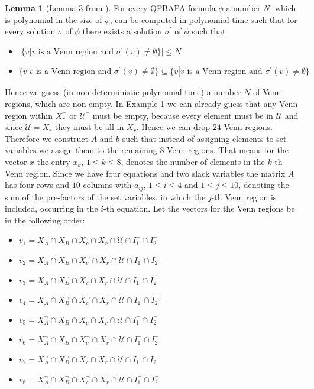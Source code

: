\documentclass{book}
\theoremstyle{break}
\theoremstyle{definition}
\newtheorem{mylem}{Lemma}
\begin{document}
\begin{mylem}[Lemma 3 from \cite{4}]
For every QFBAPA formula $\phi$ a number $N$, which is polynomial in the size of $\phi$, can be computed in polynomial time such that for every solution $\sigma$ of $\phi$ there exists a solution $\sigma^\prime$ of $\phi$ such that
\begin{itemize}
\item $|\{v|v\text{ is a Venn region and }\sigma^\prime(v)\neq \emptyset\}|\leq N$
\item $\{v|v\text{ is a Venn region and }\sigma^\prime(v)\neq \emptyset\}\subseteq \{v|v\text{ is a Venn region and }\sigma^\prime(v)\neq \emptyset\}$
\end{itemize}
\end{mylem}
Hence we guess (in non-deterministic polynomial time) a number $N$ of Venn regions, which are non-empty. In Example 1 we can already guess that any Venn region within $X_r^\neg$ or $\mathcal{U}^\neg$ must be empty, because every element must be in $\mathcal{U}$ and since $\mathcal{U}=X_r$ they must be all in $X_r$. Hence we can drop $24$ Venn regions. Therefore we construct $A$ and $b$ such that instead of assigning elements to set variables we assign them to the remaining $8$ Venn regions. That means for the vector $x$ the entry $x_k$, $1\leq k\leq 8$, denotes the number of elements in the $k$-th Venn region. Since we have four equations and two slack variables the matrix $A$ has four rows and $10$ columns with $a_{ij}$, $1\leq i\leq 4$ and $1\leq j\leq 10$, denoting the sum of the pre-factors of the set variables, in which the $j$-th Venn region is included, occurring in the $i$-th equation. Let the vectors for the Venn regions be in the following order:
\begin{itemize}
\item $v_1=X_A\cap X_B\cap X_c\cap X_r\cap \mathcal{U}\cap I_1^\neg\cap I_2^\neg$
\item $v_2=X_A\cap X_B\cap X_c^\neg\cap X_r\cap \mathcal{U}\cap I_1^\neg\cap I_2^\neg$
\item $v_3=X_A\cap X_B^\neg\cap X_c\cap X_r\cap \mathcal{U}\cap I_1^\neg\cap I_2^\neg$
\item $v_4=X_A\cap X_B^\neg\cap X_c^\neg \cap X_r\cap \mathcal{U}\cap I_1^\neg\cap I_2^\neg$
\item $v_5=X_A^\neg\cap X_B\cap X_c\cap X_r\cap \mathcal{U}\cap I_1^\neg\cap I_2^\neg$
\item $v_6=X_A^\neg\cap X_B\cap X_c^\neg\cap X_r\cap \mathcal{U}\cap I_1^\neg\cap I_2^\neg$
\item $v_7=X_A^\neg\cap X_B^\neg\cap X_c\cap X_r\cap \mathcal{U}\cap I_1^\neg\cap I_2^\neg$
\item $v_8=X_A^\neg\cap X_B^\neg\cap X_c^\neg\cap X_r\cap \mathcal{U}\cap I_1^\neg\cap I_2^\neg$
\end{itemize}
\end{document}
